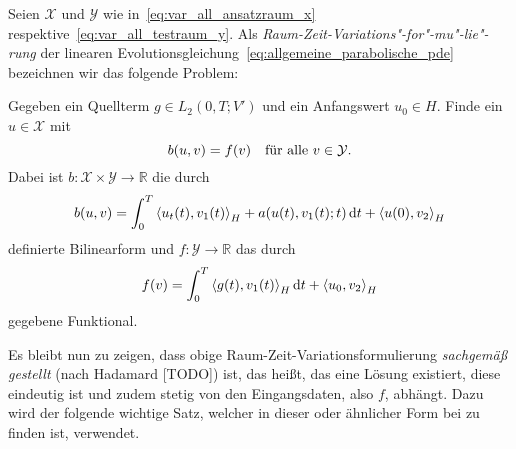 \begin{Definition}
\label{definition:variationsformulierung}
    Seien $\mathcal X$ und $\mathcal Y$ wie in~\eqref{eq:var_all_ansatzraum_x} respektive~\eqref{eq:var_all_testraum_y}.
    Als \emph{Raum-Zeit-Variations"-for"-mu"-lie"-rung} der linearen Evolutionsgleichung~\eqref{eq:allgemeine_parabolische_pde} bezeichnen wir das folgende Problem:

    Gegeben ein Quellterm $g \in L_{2}(0, T; V')$ und ein Anfangswert $u_{0} \in H$.
    Finde ein $u \in \mathcal X$ mit
    \begin{equation}
        \label{eq:var_all_problem}
        b(u, v) = f(v) \quad \fa v \in \mathcal Y.
    \end{equation}
    Dabei ist $b \colon \mathcal X \times \mathcal Y \to \mathbb{R}$ die durch
    \begin{equation}
        \label{eq:var_all_bf_b}
        b(u, v) = \int_{0}^{T} \skprod{u_{t}(t)}{v_{1}(t)}_{H} + a(u(t), v_{1}(t); t) \diff t + \skprod{u(0)}{v_{2}}_{H}
    \end{equation}
    definierte Bilinearform und $f \colon \mathcal Y \to \mathbb{R}$ das durch
    \begin{equation}
        \label{eq:var_all_f}
        f(v) = \int_{0}^{T} \skprod{g(t)}{v_{1}(t)}_{H} \diff t + \skprod{u_{0}}{v_{2}}_{H}
    \end{equation}
    gegebene Funktional.
\end{Definition}

Es bleibt nun zu zeigen, dass obige Raum-Zeit-Variationsformulierung \emph{sachgemäß gestellt} (nach Hadamard [TODO]) ist, das heißt, das eine Lösung existiert, diese eindeutig ist und zudem stetig von den Eingangsdaten, also $f$, abhängt.
Dazu wird der folgende wichtige Satz, welcher in dieser oder ähnlicher Form bei \textcites[Theorem 2.1]{Babuska:1971fx}[Theorem 5.2.1]{Aziz:2014wf}[Theorem \S{}3.3.6]{Braess:2007wm} zu finden ist, verwendet.

